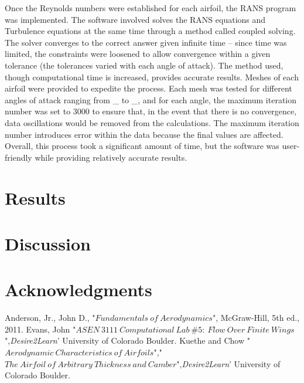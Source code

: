 \documentclass[]{aiaa-tc}%
\begin{document}
Once the Reynolds numbers were established for each airfoil, the RANS program was
implemented. The software involved solves the RANS equations and Turbulence equations at the
same time through a method called coupled solving. The solver converges to the correct answer
given infinite time – since time was limited, the constraints were loosened to allow convergence
within a given tolerance (the tolerances varied with each angle of attack). The method used,
though computational time is increased, provides accurate results. Meshes of each airfoil were
provided to expedite the process. Each mesh was tested for different angles of attack ranging
from \_ to \_, and for each angle, the maximum iteration number was set to 3000 to ensure that, in
the event that there is no convergence, data oscillations would be removed from the calculations.
The maximum iteration number introduces error within the data because the final values are
affected. Overall, this process took a significant amount of time, but the software was user-
friendly while providing relatively accurate results.



\section{Results}





\section{Discussion}





\section*{Acknowledgments}


\begin{thebibliography}{9}%
 Anderson, Jr., John D., "$Fundamentals\ of\ Aerodynamics$", McGraw-Hill, 5th ed., 2011.
Evans, John "$ASEN\  3111\  Computational\ Lab\  \#5:\ Flow\ Over\ Finite\ Wings$",{\it Desire2Learn}' University of Colorado Boulder.
Kuethe and Chow "$Aerodynamic\ Characteristics\ of\ Airfoils$","$The\ Airfoil\ of\ Arbitrary\ Thickness\ and\ Camber$",{\it Desire2Learn}' University of Colorado Boulder.
 
\end{thebibliography}




\newpage
\end{document}
